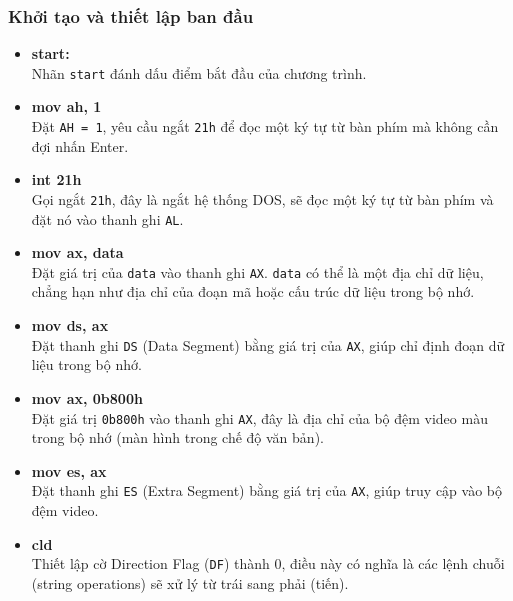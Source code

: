 \documentclass[12pt]{article}
\begin{document}
\subsubsection*{Khởi tạo và thiết lập ban đầu}
\begin{itemize}
  \begin{figure}[H]
  \centering
  \texttt{[image: pics/start.png]}
\end{figure}
    \item \textbf{start:} \\
    Nhãn \texttt{start} đánh dấu điểm bắt đầu của chương trình.

    \item \textbf{mov ah, 1} \\
    Đặt \texttt{AH = 1}, yêu cầu ngắt \texttt{21h} để đọc một ký tự từ bàn phím mà không cần đợi nhấn Enter.

    \item \textbf{int 21h} \\
    Gọi ngắt \texttt{21h}, đây là ngắt hệ thống DOS, sẽ đọc một ký tự từ bàn phím và đặt nó vào thanh ghi \texttt{AL}.

    \item \textbf{mov ax, data} \\
    Đặt giá trị của \texttt{data} vào thanh ghi \texttt{AX}. \texttt{data} có thể là một địa chỉ dữ liệu, chẳng hạn như địa chỉ của đoạn mã hoặc cấu trúc dữ liệu trong bộ nhớ.

    \item \textbf{mov ds, ax} \\
    Đặt thanh ghi \texttt{DS} (Data Segment) bằng giá trị của \texttt{AX}, giúp chỉ định đoạn dữ liệu trong bộ nhớ.

    \item \textbf{mov ax, 0b800h} \\
    Đặt giá trị \texttt{0b800h} vào thanh ghi \texttt{AX}, đây là địa chỉ của bộ đệm video màu trong bộ nhớ (màn hình trong chế độ văn bản).

    \item \textbf{mov es, ax} \\
    Đặt thanh ghi \texttt{ES} (Extra Segment) bằng giá trị của \texttt{AX}, giúp truy cập vào bộ đệm video.

    \item \textbf{cld} \\
    Thiết lập cờ Direction Flag (\texttt{DF}) thành 0, điều này có nghĩa là các lệnh chuỗi (string operations) sẽ xử lý từ trái sang phải (tiến).
\end{itemize}
\end{document}
